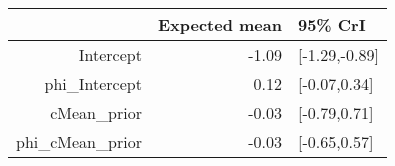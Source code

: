 \begin{tabular}{rrl}
  \hline
 & Expected mean & 95\% CrI \\ 
  \hline
Intercept & -1.09 & [-1.29,-0.89] \\ 
  phi\_Intercept & 0.12 & [-0.07,0.34] \\ 
  cMean\_prior & -0.03 & [-0.79,0.71] \\ 
  phi\_cMean\_prior & -0.03 & [-0.65,0.57] \\ 
   \hline
\end{tabular}

